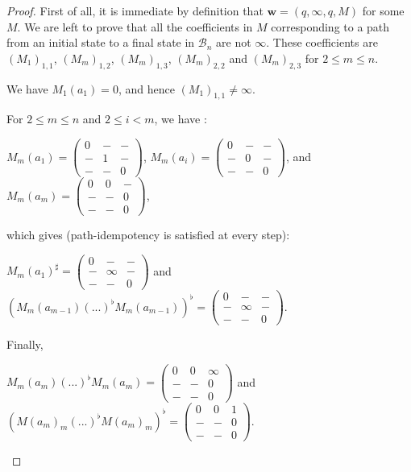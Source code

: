 \documentclass[10pt,a4paper]{amsart}
\theoremstyle{definition}
\numberwithin{equation}{section}
\theoremstyle{remark}
\newcommand{\autB}{\mathcal{B}}
\theoremstyle{remark}
\begin{document}
\begin{proof}
First of all, it is immediate by definition that $\boldsymbol{w} = (q,\infty,q, M)$ for some $M$. We are left to prove that all the coefficients in $M$ corresponding to a path from an initial state to a final state in $\autB_n$ are not $\infty$. These coefficients are $(M_1)_{1,1}$, $(M_m)_{1,2}$, $(M_m)_{1,3}$, $(M_m)_{2,2}$  and $(M_m)_{2,3}$ for $2\leq m \leq n$.

We have $M_{1}(a_1)=0$, and hence $(M_{1})_{1,1} \neq \infty$.

For $2 \leq m \leq n$ and $2 \leq i < m$, we have : 
  \begin{center}
      $M_{m}(a_1) =  
      \begin{pmatrix}
          0 & - & - \\
          - & 1 & -\\
          - & - & 0
      \end{pmatrix}$, 
      $M_{m}(a_i) = 
      \begin{pmatrix}
          0 & - & - \\
          - & 0 & - \\
          - & - & 0
      \end{pmatrix}$, and
      $M_{m}(a_m) = 
      \begin{pmatrix}
          0 & 0 & - \\
          - & - & 0 \\
          - & - & 0
      \end{pmatrix}$, 
\end{center}

which gives (path-idempotency is satisfied at every step):

\begin{center}
      $M_{m}(a_1)^\sharp = 
      \begin{pmatrix}
          0 & - & - \\
          - & \infty & -\\
          - & - & 0
      \end{pmatrix}$ and
      $(M_{m}(a_{m-1})(...)^\flat M_{m}(a_{m-1}))^\flat= 
      \begin{pmatrix}
          0 & - & - \\
          - & \infty & -\\
          - & - & 0
      \end{pmatrix}$.
  \end{center}

Finally,
    \begin{center}
      $M_{m}(a_m)(...)^\flat M_{m}(a_m) = 
      \begin{pmatrix}
          0 & 0 & \infty \\
          - &- & 0\\
          - & - & 0
      \end{pmatrix}$ and
      $(M(a_{m})_{m}(...)^\flat M(a_{m})_{m})^\flat= 
      \begin{pmatrix}
          0 & 0 & 1 \\
          - & - & 0\\
          - & - & 0
      \end{pmatrix}$.
  \end{center} 


\end{proof}
\end{document}
